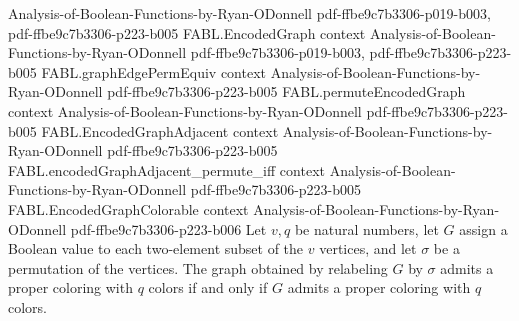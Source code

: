 \begin{theorem}
  {Analysis-of-Boolean-Functions-by-Ryan-ODonnell}
  {pdf-ffbe9c7b3306-p019-b003,
    pdf-ffbe9c7b3306-p223-b005}
\proofstep
  {FABL.EncodedGraph}
  {context}
  {Analysis-of-Boolean-Functions-by-Ryan-ODonnell}
  {pdf-ffbe9c7b3306-p019-b003,
    pdf-ffbe9c7b3306-p223-b005}
\proofstep
  {FABL.graphEdgePermEquiv}
  {context}
  {Analysis-of-Boolean-Functions-by-Ryan-ODonnell}
  {pdf-ffbe9c7b3306-p223-b005}
\proofstep
  {FABL.permuteEncodedGraph}
  {context}
  {Analysis-of-Boolean-Functions-by-Ryan-ODonnell}
  {pdf-ffbe9c7b3306-p223-b005}
\proofstep
  {FABL.EncodedGraphAdjacent}
  {context}
  {Analysis-of-Boolean-Functions-by-Ryan-ODonnell}
  {pdf-ffbe9c7b3306-p223-b005}
\proofstep
  {FABL.encodedGraphAdjacent_permute_iff}
  {context}
  {Analysis-of-Boolean-Functions-by-Ryan-ODonnell}
  {pdf-ffbe9c7b3306-p223-b005}
\proofstep
  {FABL.EncodedGraphColorable}
  {context}
  {Analysis-of-Boolean-Functions-by-Ryan-ODonnell}
  {pdf-ffbe9c7b3306-p223-b006}
Let $v,q$ be natural numbers, let $G$ assign a Boolean value to each two-element subset
of the $v$ vertices, and let $\sigma$ be a permutation of the vertices. The graph
obtained by relabeling $G$ by $\sigma$ admits a proper coloring with $q$ colors if and
only if $G$ admits a proper coloring with $q$ colors.
\end{theorem}

